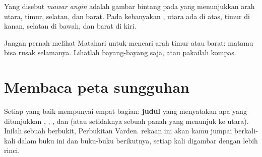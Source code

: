 \begin{definition}\label{def:g2:drawing-to-map:directions}
Yang disebut \emph{mawar angin} adalah gambar bintang
pada  yang menunjukkan arah utara, timur, selatan, dan barat. Pada
kebanyakan , utara ada di atas, timur di kanan, selatan di bawah, dan
barat di kiri.
\end{definition}

\begin{safety}
Jangan pernah melihat Matahari untuk mencari arah timur atau barat: matamu
bisa rusak selamanya. Lihatlah bayang-bayang saja, atau pakailah kompas.
\end{safety}

\section{Membaca peta sungguhan}

Setiap  yang baik mempunyai empat bagian: \textbf{judul} yang
menyatakan apa yang ditunjukkan , \textbf{}, \textbf{}, dan
\textbf{} (atau setidaknya sebuah panah yang menunjuk ke utara).
Inilah  sebuah  berbukit, Perbukitan Varden.  rekaan ini
akan kamu jumpai berkali-kali dalam buku ini dan buku-buku berikutnya,
setiap kali digambar dengan lebih rinci.

